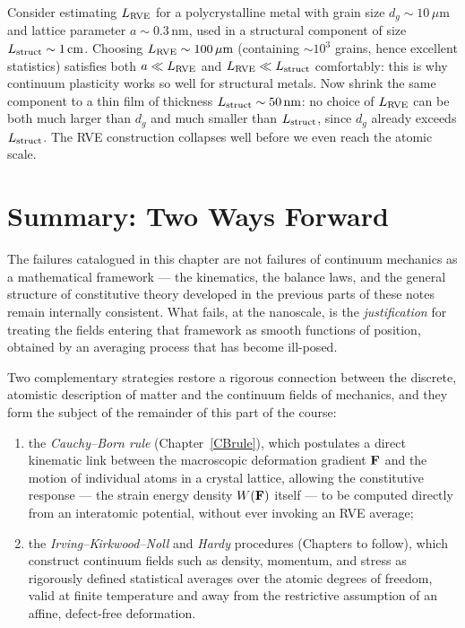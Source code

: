 \begin{example}
	Consider estimating $L_{\rm RVE}$ for a polycrystalline metal with grain size $d_g \sim 10\,\mu\mathrm{m}$ and lattice parameter $a\sim 0.3\,\mathrm{nm}$, used in a structural component of size $L_{\rm struct}\sim 1\,\mathrm{cm}$. Choosing $L_{\rm RVE}\sim 100\,\mu\mathrm{m}$ (containing $\sim 10^3$ grains, hence excellent statistics) satisfies both $a\ll L_{\rm RVE}$ and $L_{\rm RVE}\ll L_{\rm struct}$ comfortably: this is why continuum plasticity works so well for structural metals. Now shrink the same component to a thin film of thickness $L_{\rm struct}\sim 50\,\mathrm{nm}$: no choice of $L_{\rm RVE}$ can be both much larger than $d_g$ and much smaller than $L_{\rm struct}$, since $d_g$ already exceeds $L_{\rm struct}$. The RVE construction collapses well before we even reach the atomic scale.
\end{example}

\section{Summary: Two Ways Forward}

The failures catalogued in this chapter are not failures of continuum mechanics as a mathematical framework --- the kinematics, the balance laws, and the general structure of constitutive theory developed in the previous parts of these notes remain internally consistent. What fails, at the nanoscale, is the \textit{justification} for treating the fields entering that framework as smooth functions of position, obtained by an averaging process that has become ill-posed.

Two complementary strategies restore a rigorous connection between the discrete, atomistic description of matter and the continuum fields of mechanics, and they form the subject of the remainder of this part of the course:
\begin{enumerate}
	\item[(i)] the \textit{Cauchy--Born rule} (Chapter~\ref{CBrule}), which postulates a direct kinematic link between the macroscopic deformation gradient $\mathbf{F}$ and the motion of individual atoms in a crystal lattice, allowing the constitutive response --- the strain energy density $W(\mathbf{F})$ itself --- to be computed directly from an interatomic potential, without ever invoking an RVE average;
	\item[(ii)] the \textit{Irving--Kirkwood--Noll} and \textit{Hardy} procedures (Chapters to follow), which construct continuum fields such as density, momentum, and stress as rigorously defined statistical averages over the atomic degrees of freedom, valid at finite temperature and away from the restrictive assumption of an affine, defect-free deformation.
\end{enumerate}

